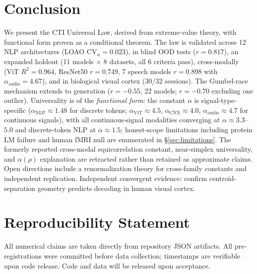\documentclass{article}
\begin{document}
\section{Conclusion}
We present the CTI Universal Law, derived from extreme-value theory, with functional form proven as a conditional theorem. The law is validated across 12 NLP architectures (LOAO CV$_\alpha=0.023$), in blind OOD tests ($r=0.817$), an expanded holdout (11 models $\times$ 8 datasets, all 6 criteria pass), cross-modally (ViT $R^2=0.964$, ResNet50 $r=0.749$, 7 speech models $r=0.898$ with $\alpha_\mathrm{audio}=4.67$), and in biological visual cortex (30/32 sessions). The Gumbel-race mechanism extends to generation ($r=-0.55$, 22 models; $r=-0.70$ excluding one outlier). Universality is of the \emph{functional form}: the constant $\alpha$ is signal-type-specific ($\alpha_\mathrm{NLP}\approx1.48$ for discrete tokens; $\alpha_\mathrm{ViT}\approx4.5$, $\alpha_\mathrm{CNN}\approx4.0$, $\alpha_\mathrm{audio}\approx4.7$ for continuous signals), with all continuous-signal modalities converging at $\alpha\approx3.3$--$5.0$ and discrete-token NLP at $\alpha\approx1.5$; honest-scope limitations including protein LM failure and human fMRI null are enumerated in \S\ref{sec:limitations}. The formerly reported cross-modal equicorrelation constant, near-simplex universality, and $\alpha(\rho)$ explanation are retracted rather than retained as approximate claims. Open directions include a renormalization theory for cross-family constants and independent replication. Independent convergent evidence: \citet{styves2025} confirm centroid-separation geometry predicts decoding in human visual cortex.

\section*{Reproducibility Statement}
All numerical claims are taken directly from repository JSON artifacts. All pre-registrations were committed before data collection; timestamps are verifiable upon code release. Code and data will be released upon acceptance.
\end{document}
